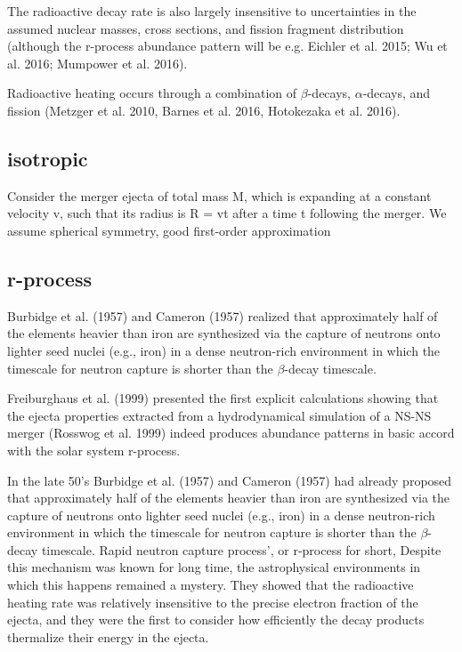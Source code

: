The radioactive decay rate is also largely insensitive to uncertainties in the assumed nuclear masses, cross sections, and fission fragment distribution (although the r-process abundance pattern will be e.g. Eichler et al. 2015; Wu et al. 2016; Mumpower et al. 2016).

Radioactive heating occurs through a combination of $\beta$-decays, $\alpha$-decays, and fission (Metzger et al. 2010, Barnes et al. 2016, Hotokezaka et al. 2016). 

\subsection{isotropic}

Consider the merger ejecta of total mass M, which is expanding at a constant velocity v, such that its radius is R = vt after a time t following the merger. 
We assume spherical symmetry, good first-order approximation

\subsection{r-process}

Burbidge et al. (1957) and Cameron (1957) realized that approximately half of the elements heavier than iron are synthesized via the capture of neutrons onto lighter seed nuclei (e.g., iron) in a dense neutron-rich environment in which the timescale for neutron capture is shorter than the $\beta$-decay timescale.

Freiburghaus et al. (1999) presented the first explicit calculations showing that the ejecta properties extracted from a hydrodynamical simulation of a NS-NS merger (Rosswog et al. 1999) indeed produces abundance patterns in basic accord with the solar system r-process.

In the late 50's Burbidge et al. (1957) and Cameron (1957) had already proposed that approximately half of the elements heavier than iron are synthesized via the capture of neutrons onto lighter seed nuclei (e.g., iron) in a dense neutron-rich environment in which the timescale for neutron capture is shorter than the $\beta$-decay timescale.
Rapid neutron capture process', or r-process for short, 
Despite this mechanism was known for long time, the astrophysical environments in which this happens remained a mystery.
They showed that the radioactive heating rate was relatively insensitive to the precise electron fraction of the ejecta, and they were the first to consider how efficiently the decay products thermalize their energy in the ejecta.

